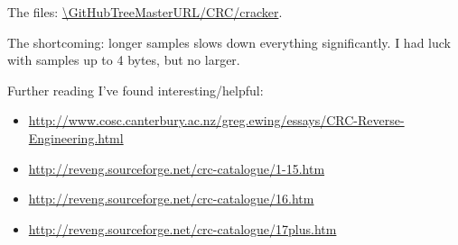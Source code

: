 The files: \url{\GitHubTreeMasterURL/CRC/cracker}.

The shortcoming: longer samples slows down everything significantly.
I had luck with samples up to 4 bytes, but no larger.

Further reading I've found interesting/helpful:

\begin{itemize}

\item \url{http://www.cosc.canterbury.ac.nz/greg.ewing/essays/CRC-Reverse-Engineering.html}
\item \url{http://reveng.sourceforge.net/crc-catalogue/1-15.htm}
\item \url{http://reveng.sourceforge.net/crc-catalogue/16.htm}
\item \url{http://reveng.sourceforge.net/crc-catalogue/17plus.htm}

\end{itemize}

